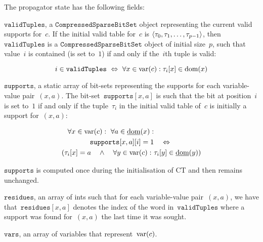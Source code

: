 \documentclass[a4paper,11pt]{article}
\theoremstyle{definition}
\newcommand{\Dom}[1]{\text{dom}({#1})}
\newcommand{\Dominit}[1]{\underline{\text{dom}}(#1)}
\newcommand{\Words}{\texttt{words}}
\newcommand{\SparseBitSet}{\texttt{CompressedSparseBitSet}}
\newcommand{\CurrTable}{\texttt{validTuples}}
\newcommand{\Supports}{\texttt{supports}}
\newcommand{\Residues}{\texttt{residues}}
\newcommand{\Vars}{\texttt{vars}}
\numberwithin{equation}{section}
\begin{document}
The propagator state has the following fields:

\begin{itemize}
  \begin{sloppypar}
      \item $\CurrTable$, a $\SparseBitSet$ object representing the current valid
        supports for~$c$. If the initial valid table for~$c$
        is $\left\langle\tau_0, \tau_1, \ldots, \tau_{p-1}\right\rangle$,
        then~$\CurrTable$ is a
        $\SparseBitSet$ object of initial size~$p$, such that value~$i$
        is contained (is set to~$1$) if and only if the~$i$th tuple is valid:
  \end{sloppypar}

    \begin{equation} \label{eq:currtable}
      i \in \CurrTable \ \Leftrightarrow \ \forall x \in \Variables{c}: \tau_i[x] \in \Dom{x}
    \end{equation}

  \item $\Supports$, a static array of bit-sets representing
    the supports for each variable-value pair~$(x,a)$.
    The bit-set~$\Supports[x,a]$ is such that
    the bit at position~$i$ is set to~$1$ if and only if the
    tuple~$\tau_i$ in the initial valid table of~$c$ is initially a support for~$(x,a)$:

    \begin{alignat}{1}
      \forall x \in \Variables{c}: \ \forall a \in \Dominit{x}:& \\
      \Supports[x,a][i] = 1 &\quad \Leftrightarrow \\
      (\tau_i[x] = a \quad \land \quad
      \forall y \in \Variables{c}: \ &\tau_i[y] \in \Dominit{y})
    \end{alignat}

    $\Supports$ is computed once during the initialisation of CT and then
    remains unchanged.

    \begin{sloppypar}
        \item $\Residues$, an array of ints such that for each variable-value pair~$(x,a)$,
          we have that~$\Residues[x,a]$ denotes the index
          of the word in~$\CurrTable$
          where a support was found for~$(x,a)$ the last time it was sought.
    \end{sloppypar}

  \item $\Vars$, an array of variables that represent~$\text{var}(c)$.

\end{itemize}
\end{document}
